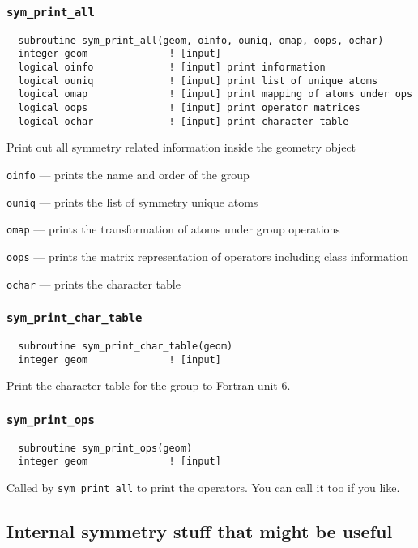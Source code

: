 \subsubsection{{\tt sym\_print\_all}}
\begin{verbatim}
  subroutine sym_print_all(geom, oinfo, ouniq, omap, oops, ochar)
  integer geom              ! [input]
  logical oinfo             ! [input] print information
  logical ouniq             ! [input] print list of unique atoms
  logical omap              ! [input] print mapping of atoms under ops
  logical oops              ! [input] print operator matrices
  logical ochar             ! [input] print character table
\end{verbatim}
Print out all symmetry related information inside the geometry object
\begin{description}
\item{\tt oinfo} --- prints the name and order of the group
\item{\tt ouniq} --- prints the list of symmetry unique atoms
\item{\tt omap} --- prints the transformation of atoms under group operations
\item{\tt oops} --- prints the matrix representation of operators including
  class information
\item {\tt ochar} --- prints the character table
\end{description}

\subsubsection{{\tt sym\_print\_char\_table}}
\begin{verbatim}
  subroutine sym_print_char_table(geom)
  integer geom              ! [input]
\end{verbatim}
Print the character table for the group to Fortran unit 6.


\subsubsection{{\tt sym\_print\_ops}}
\begin{verbatim}
  subroutine sym_print_ops(geom)
  integer geom              ! [input]
\end{verbatim}
Called by \verb+sym_print_all+ to print the operators.  You can call
it too if you like.

\subsection{Internal symmetry stuff that might be useful}

